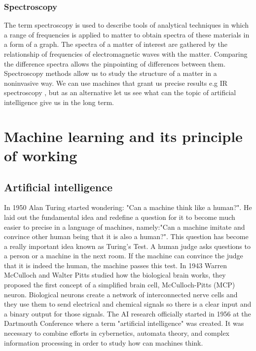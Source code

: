 \documentclass[a4paper,oneside,openright,11pt]{book}
\begin{document}
\subsection{Spectroscopy}


The term spectroscopy is used to describe tools of analytical techniques in which a range of frequencies is applied to matter to obtain spectra of these materials in a form of a graph. The spectra of a matter of interest are gathered by the relationship of frequencies of electromagnetic waves with the matter. Comparing the difference spectra allows the pinpointing of differences between them. Spectroscopy methods allow us to study the structure of a matter in a noninvasive way. We can use machines that grant us precise results e.g IR spectroscopy \cite{maszyny}, but as an alternative let us see what can the topic of artificial intelligence give us in the long term.

\chapter{Machine learning and its principle of working}


\section{Artificial intelligence}

In 1950 Alan Turing started wondering: "Can a machine think like a human?". He laid out the fundamental idea and redefine a question for it to become much easier to precise in a language of machines, namely:"Can a machine imitate and convince other human being that it is also a human?". This question has become a really important idea known as Turing's Test. A human judge asks questions to a person or a machine in the next room. If the machine can convince the judge that it is indeed the human, the machine passes this test. In 1943 Warren McCulloch and Walter Pitts studied how the biological brain works, they proposed the first concept of a simplified brain cell, McCulloch-Pitts (MCP) neuron. Biological neurons create a network of interconnected nerve cells and they use them to send electrical and chemical signals so there is a clear input and a binary output for those signals.\cite{neuron}
The AI research officially started in 1956 at the Dartmouth Conference where a term "artificial intelligence" was created. It was necessary to combine efforts in cybernetics, automata theory, and complex information processing in order to study how can machines think.\cite{histAI}
\end{document}
